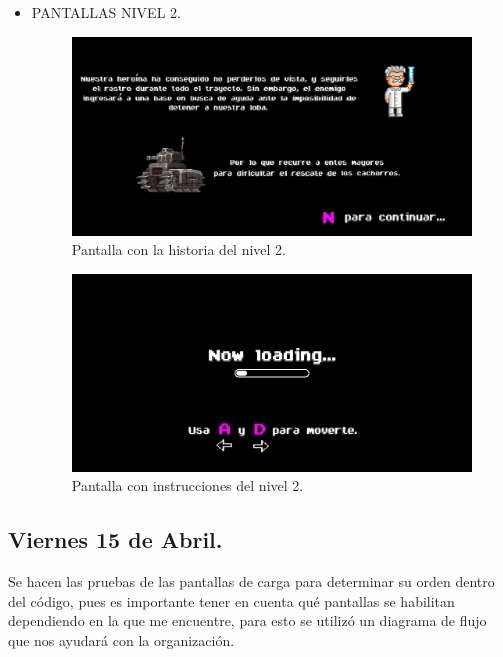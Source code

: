 \documentclass{article}
\begin{document}
\begin{itemize}
    \newpage
    \item PANTALLAS NIVEL 2.
        \begin{figure}[h]
        \includegraphics[scale=0.4]{Images/pantallahistoria2.png}
        \centering
        \caption{Pantalla con la historia del nivel 2.}
        \label{fig:pantallains2}
        \end{figure}
        
        \begin{figure}[h]
        \includegraphics[scale=0.4]{Images/pannivel2.png}
        \centering
        \caption{Pantalla con instrucciones del nivel 2.}
        \label{fig:pantallains21}
        \end{figure}
        
\end{itemize}

\subsection{Viernes 15 de Abril.}
Se hacen las pruebas de las pantallas de carga para determinar su orden dentro del código, pues es importante tener en cuenta qué pantallas se habilitan dependiendo en la que me encuentre, para esto se utilizó un diagrama de flujo que nos ayudará con la organización. 
\end{document}
